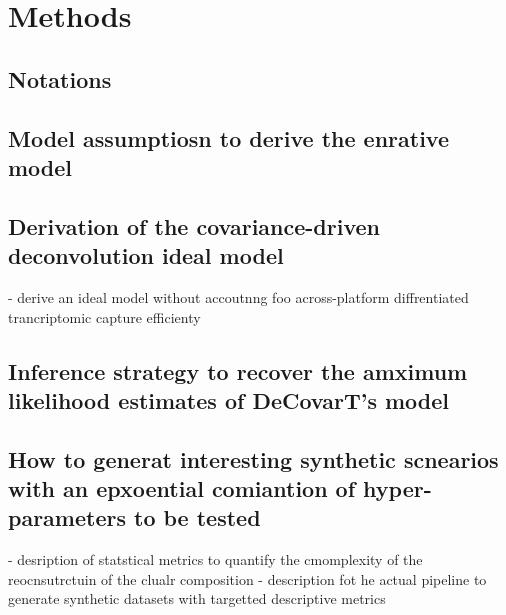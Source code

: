 \documentclass[pdflatex, sn-nature]{sn-jnl}
\theoremstyle{thmstyleone}%
\theoremstyle{thmstyletwo}%
\theoremstyle{thmstylethree}%
\begin{document}
    \section{Methods}

    \subsection{Notations}

    \subsection{Model assumptiosn to derive the enrative model}


    \subsection{Derivation of the covariance-driven deconvolution ideal model}

    - derive an ideal model without accoutnng foo across-platform diffrentiated trancriptomic capture efficienty

    \subsection{Inference strategy to recover the amximum likelihood estimates of DeCovarT's model}

    \subsection{How to generat interesting synthetic scnearios with an epxoential comiantion of hyper-parameters to be tested}

    - desription of statstical metrics to quantify the cmomplexity of the reocnsutrctuin of the clualr composition
    - description fot he actual pipeline to generate synthetic datasets with targetted descriptive metrics

\end{document}
